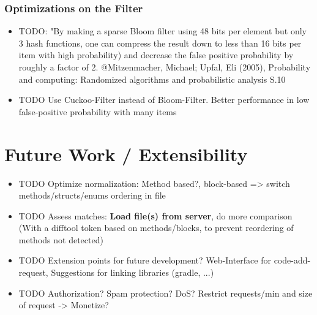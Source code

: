\subsubsection{Optimizations on the Filter}
\begin{itemize}
\item TODO: "By making a sparse Bloom filter using 48 bits per element but only 3 hash functions, one can compress the result down to less than 16 bits per item with high probability) and decrease the false positive probability by roughly a factor of 2. @Mitzenmacher, Michael; Upfal, Eli (2005), Probability and computing: Randomized algorithms and probabilistic analysis S.10
\item TODO Use Cuckoo-Filter \cite{fan2014cuckoo} instead of Bloom-Filter. Better performance in low false-positive probability with many items
\end{itemize}

\section{Future Work / Extensibility}\label{section:approach/extensibility}
\begin{itemize}
	\item TODO Optimize normalization: Method based?, block-based => switch methods/structs/enums ordering in file
	\item TODO Assess matches: \textbf{Load file(s) from server}, do more comparison (With a difftool token based on methods/blocks, to prevent reordering of methods not detected)
	\item TODO Extension points for future development? Web-Interface for code-add-request, Suggestions for linking libraries (gradle, ...)
	\item TODO Authorization? Spam protection? DoS? Restrict requests/min and size of request -> Monetize?
\end{itemize}


